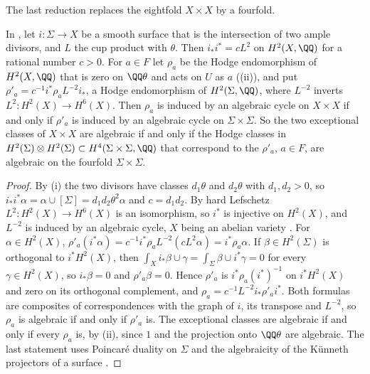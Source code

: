 The last reduction replaces the eightfold $X\times X$ by a fourfold.

\begin{proposition}[A surface in $X$]\label{prop:mumfordsurface}
In , let $i\colon\Sigma\to X$ be a smooth surface that is
the intersection of two ample divisors, and $L$ the cup product with
$\theta$. Then $i_{*}i^{*}=cL^{2}$ on $H^{2}(X,\QQ)$ for a rational number
$c>0$. For $a\in F$ let $\rho_{a}$ be the Hodge endomorphism of
$H^{2}(X,\QQ)$ that is zero on $\QQ\theta$ and acts on $U$ as $a$
((ii)), and put
$\rho'_{a}=c^{-1}i^{*}\rho_{a}L^{-2}i_{*}$, a Hodge endomorphism of
$H^{2}(\Sigma,\QQ)$, where $L^{-2}$ inverts $L^{2}\colon H^{2}(X)\to
H^{6}(X)$. Then $\rho_{a}$ is induced by an algebraic cycle on $X\times X$ if
and only if $\rho'_{a}$ is induced by an algebraic cycle on $\Sigma\times
\Sigma$. So the two exceptional classes of $X\times X$ are algebraic if and
only if the Hodge classes in $H^{2}(\Sigma)\otimes H^{2}(\Sigma)\subset
H^{4}(\Sigma\times\Sigma,\QQ)$ that correspond to the $\rho'_{a}$, $a\in F$,
are algebraic on the fourfold $\Sigma\times\Sigma$.
\end{proposition}

\begin{proof}
By (i) the two divisors have classes $d_{1}\theta$
and $d_{2}\theta$ with $d_{1},d_{2}>0$, so $i_{*}i^{*}\alpha=\alpha\cup
[\Sigma]=d_{1}d_{2}\theta^{2}\alpha$ and $c=d_{1}d_{2}$. By hard Lefschetz
$L^{2}\colon H^{2}(X)\to H^{6}(X)$ is an isomorphism, so $i^{*}$ is injective
on $H^{2}(X)$, and $L^{-2}$ is induced by an algebraic cycle, $X$ being an
abelian variety \cite[\S2]{Kle68}. For $\alpha\in H^{2}(X)$,
$\rho'_{a}(i^{*}\alpha)=c^{-1}i^{*}\rho_{a}L^{-2}(cL^{2}\alpha)=
i^{*}\rho_{a}\alpha$. If $\beta\in H^{2}(\Sigma)$ is orthogonal to
$i^{*}H^{2}(X)$, then $\int_{X}i_{*}\beta\cup\gamma=\int_{\Sigma}\beta\cup
i^{*}\gamma=0$ for every $\gamma\in H^{2}(X)$, so $i_{*}\beta=0$ and
$\rho'_{a}\beta=0$. Hence $\rho'_{a}$ is $i^{*}\rho_{a}(i^{*})^{-1}$ on
$i^{*}H^{2}(X)$ and zero on its orthogonal complement, and
$\rho_{a}=c^{-1}L^{-2}i_{*}\rho'_{a}i^{*}$. Both formulas are composites of
correspondences with the graph of $i$, its transpose and $L^{-2}$, so
$\rho_{a}$ is algebraic if and only if $\rho'_{a}$ is. The exceptional classes
are algebraic if and only if every $\rho_{a}$ is, by
(ii), since $1$ and the projection onto $\QQ\theta$ are
algebraic. The last statement uses Poincar\'e duality on $\Sigma$ and the
algebraicity of the K\"unneth projectors of a surface \cite{Mur90}.
\end{proof}


